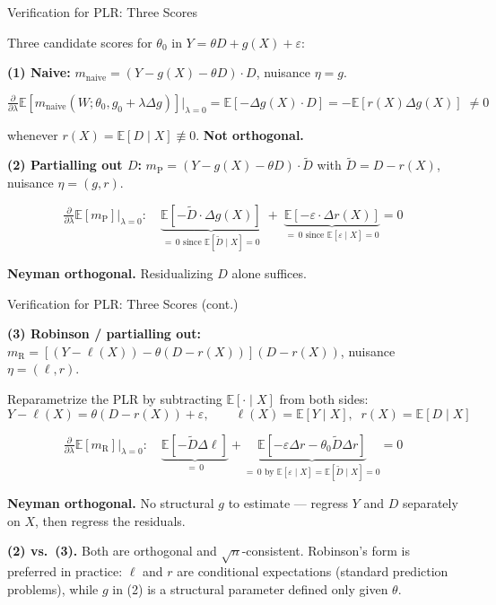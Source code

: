 \documentclass[aspectratio=169, 11pt, handout]{beamer}
\newcommand{\E}{\mathbb{E}}
\begin{document}
\begin{frame}{Verification for PLR: Three Scores}
 
Three candidate scores for $\theta_0$ in $Y = \theta D + g(X) + \varepsilon$:
 
\bigskip
 
\textbf{(1) Naive:} $m_{\text{naive}} = (Y - g(X) - \theta D) \cdot D$, \quad nuisance $\eta = g$.
 
\[
\tfrac{\partial}{\partial\lambda}\E[m_{\text{naive}}(W; \theta_0, g_0 + \lambda\Delta g)]\big|_{\lambda=0} = \E[-\Delta g(X) \cdot D] = -\E[r(X)\Delta g(X)] \;\neq 0
\]
 
whenever $r(X) = \E[D \mid X] \not\equiv 0$. \textbf{Not orthogonal.}
 
\bigskip
\pause
 
\textbf{(2) Partialling out $D$:} $m_{\text{P}} = (Y - g(X) - \theta D) \cdot \tilde D$ with $\tilde D = D - r(X)$, \quad nuisance $\eta = (g, r)$.
 
\[
\tfrac{\partial}{\partial\lambda}\E[m_{\text{P}}]\big|_{\lambda=0}: \quad \underbrace{\E[-\tilde D \cdot \Delta g(X)]}_{=\,0 \text{ since } \E[\tilde D \mid X]=0} \;+\; \underbrace{\E[-\varepsilon \cdot \Delta r(X)]}_{=\,0 \text{ since } \E[\varepsilon \mid X]=0} = 0
\]
 
\textbf{Neyman orthogonal.} Residualizing $D$ alone suffices.
 
\end{frame}
 
\begin{frame}{Verification for PLR: Three Scores (cont.)}
 
\textbf{(3) Robinson / partialling out:} $m_{\text{R}} = [(Y - \ell(X)) - \theta(D - r(X))](D - r(X))$, nuisance $\eta = (\ell, r)$.
 
Reparametrize the PLR by subtracting $\E[\cdot \mid X]$ from both sides:
\[
Y - \ell(X) = \theta (D - r(X)) + \varepsilon, \qquad \ell(X) = \E[Y \mid X], \;\; r(X) = \E[D \mid X]
\]
 
\[
\tfrac{\partial}{\partial\lambda}\E[m_{\text{R}}]\big|_{\lambda=0}: \quad \underbrace{\E[-\tilde D \Delta\ell]}_{=\,0} + \underbrace{\E[-\varepsilon\Delta r - \theta_0 \tilde D \Delta r]}_{=\,0 \text{ by } \E[\varepsilon \mid X]=\E[\tilde D \mid X]=0} = 0
\]
 
\textbf{Neyman orthogonal.} No structural $g$ to estimate — regress $Y$ and $D$ separately on $X$, then regress the residuals.
 
\pause
\bigskip
 
\textbf{(2) vs.\ (3).} Both are orthogonal and $\sqrt n$-consistent. Robinson's form is preferred in practice: $\ell$ and $r$ are conditional expectations (standard prediction problems), while $g$ in (2) is a structural parameter defined only given $\theta$.
 
\end{frame}
\end{document}
